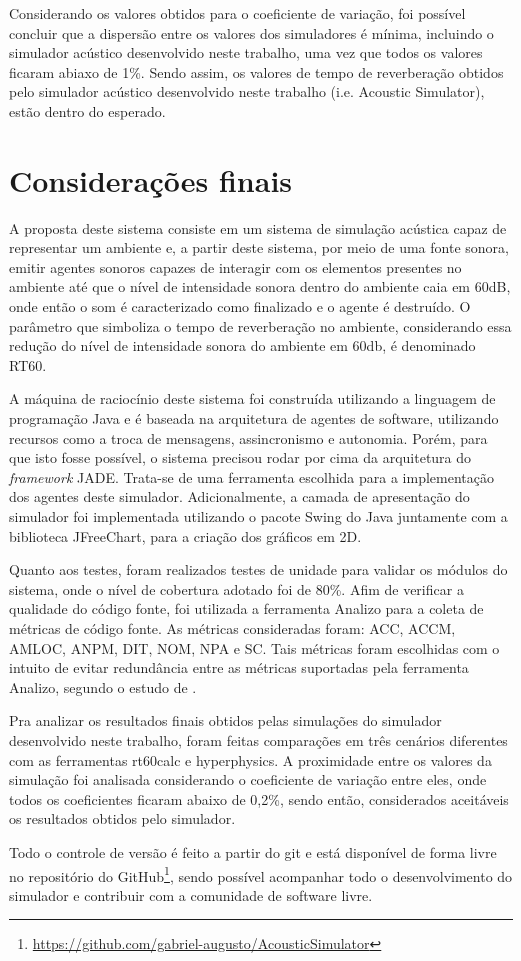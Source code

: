 Considerando os valores obtidos para o coeficiente de variação, foi possível concluir que a dispersão entre os valores dos simuladores é mínima, incluindo o simulador acústico desenvolvido neste trabalho, uma vez que todos os valores ficaram abiaxo de 1\%. Sendo assim, os valores de tempo de reverberação obtidos pelo simulador acústico desenvolvido neste trabalho (i.e. Acoustic Simulator), estão dentro do esperado.

\section{Considerações finais}

A proposta deste sistema consiste em um sistema de simulação acústica capaz de representar um ambiente e, a partir deste sistema, por meio de uma fonte sonora, emitir agentes sonoros capazes de interagir com os elementos presentes no ambiente até que o nível de intensidade sonora dentro do ambiente caia em 60dB, onde então o som é caracterizado como finalizado e o agente é destruído. O parâmetro que simboliza o tempo de reverberação no ambiente, considerando essa redução do nível de intensidade sonora do ambiente em 60db, é denominado RT60.

A máquina de raciocínio deste sistema foi construída utilizando a linguagem de programação Java e é baseada na arquitetura de agentes de software, utilizando recursos como a troca de mensagens, assincronismo e autonomia. Porém, para que isto fosse possível, o sistema precisou rodar por cima da arquitetura do \textit{framework} JADE. Trata-se de uma ferramenta escolhida para a implementação dos agentes deste simulador. Adicionalmente, a camada de apresentação do simulador foi implementada utilizando o pacote Swing do Java juntamente com a biblioteca JFreeChart, para a criação dos gráficos em 2D.

Quanto aos testes, foram realizados testes de unidade para validar os módulos do sistema, onde o nível de cobertura adotado foi de 80\%. Afim de verificar a qualidade do código fonte, foi utilizada a ferramenta Analizo para a coleta de métricas de código fonte. As métricas consideradas foram: ACC, ACCM, AMLOC, ANPM, DIT, NOM, NPA e SC. Tais métricas foram escolhidas com o intuito de evitar redundância entre as métricas suportadas pela ferramenta Analizo, segundo o estudo de .

Pra analizar os resultados finais obtidos pelas simulações do simulador desenvolvido neste trabalho, foram feitas comparações em três cenários diferentes com as ferramentas rt60calc e hyperphysics. A proximidade entre os valores da simulação foi analisada considerando o coeficiente de variação entre eles, onde todos os coeficientes ficaram abaixo de 0,2\%, sendo então, considerados aceitáveis os resultados obtidos pelo simulador. 

Todo o controle de versão é feito a partir do git e está disponível de forma livre no repositório do GitHub\footnote{\url{https://github.com/gabriel-augusto/AcousticSimulator}}, sendo possível acompanhar todo o desenvolvimento do simulador e contribuir com a comunidade de software livre.
